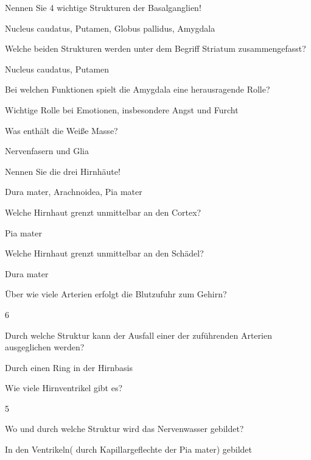 \documentclass[10pt, a4paper]{exam}
\begin{document}
\begin{questions}
  \question Nennen Sie 4 wichtige Strukturen der Basalganglien!
  \begin{solution}
    Nucleus caudatus, Putamen, Globus pallidus, Amygdala
  \end{solution}

  \question Welche beiden Strukturen werden unter dem Begriff Striatum zusammengefasst?
  \begin{solution}
    Nucleus caudatus, Putamen
  \end{solution}

  \question Bei welchen Funktionen spielt die Amygdala eine herausragende Rolle?
  \begin{solution}
    Wichtige Rolle bei Emotionen, insbesondere Angst und Furcht
  \end{solution}

  \question Was enthält die Weiße Masse?
  \begin{solution}
    Nervenfasern und Glia
  \end{solution}

  \question Nennen Sie die drei Hirnhäute!
  \begin{solution}
    Dura mater, Arachnoidea, Pia mater
  \end{solution}

  \question Welche Hirnhaut grenzt unmittelbar an den Cortex?
  \begin{solution}
    Pia mater
  \end{solution}

  \question Welche Hirnhaut grenzt unmittelbar an den Schädel?
  \begin{solution}
    Dura mater
  \end{solution}

  \question Über wie viele Arterien erfolgt die Blutzufuhr zum Gehirn?
  \begin{solution}
    6
  \end{solution}

  \question Durch welche Struktur kann der Ausfall einer der zuführenden Arterien ausgeglichen werden?
  \begin{solution}
    Durch einen Ring in der Hirnbasis
  \end{solution}

  \question Wie viele Hirnventrikel gibt es?
  \begin{solution}
    5
  \end{solution}

  \question Wo und durch welche Struktur wird das Nervenwasser gebildet?
  \begin{solution}
    In den Ventrikeln( durch Kapillargeflechte der Pia mater) gebildet
  \end{solution}


\end{questions}
\end{document}
